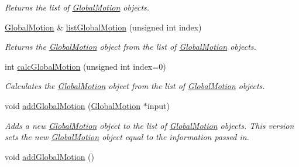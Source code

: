 \begin{DoxyCompactItemize}
\begin{DoxyCompactList}\small\item\em Returns the list of \hyperlink{classosea_1_1ofreq_1_1_global_motion}{Global\-Motion} objects. \end{DoxyCompactList}\item 
\hyperlink{classosea_1_1ofreq_1_1_global_motion}{Global\-Motion} \& \hyperlink{classosea_1_1ofreq_1_1_outputs_body_a663088b51a3645982f5cc2111a72563a}{list\-Global\-Motion} (unsigned int index)
\begin{DoxyCompactList}\small\item\em Returns the \hyperlink{classosea_1_1ofreq_1_1_global_motion}{Global\-Motion} object from the list of \hyperlink{classosea_1_1ofreq_1_1_global_motion}{Global\-Motion} objects. \end{DoxyCompactList}\item 
int \hyperlink{classosea_1_1ofreq_1_1_outputs_body_a4d34ba129bf256740731225b11c579bf}{calc\-Global\-Motion} (unsigned int index=0)
\begin{DoxyCompactList}\small\item\em Calculates the \hyperlink{classosea_1_1ofreq_1_1_global_motion}{Global\-Motion} object from the list of \hyperlink{classosea_1_1ofreq_1_1_global_motion}{Global\-Motion} objects. \end{DoxyCompactList}\item 
void \hyperlink{classosea_1_1ofreq_1_1_outputs_body_a015653c3344d036543668ffe7b4a41db}{add\-Global\-Motion} (\hyperlink{classosea_1_1ofreq_1_1_global_motion}{Global\-Motion} $\ast$input)
\begin{DoxyCompactList}\small\item\em Adds a new \hyperlink{classosea_1_1ofreq_1_1_global_motion}{Global\-Motion} object to the list of \hyperlink{classosea_1_1ofreq_1_1_global_motion}{Global\-Motion} objects. This version sets the new \hyperlink{classosea_1_1ofreq_1_1_global_motion}{Global\-Motion} object equal to the information passed in. \end{DoxyCompactList}\item 
\hypertarget{classosea_1_1ofreq_1_1_outputs_body_a889dcf6d9be6e910c110018e0a309eae}{void \hyperlink{classosea_1_1ofreq_1_1_outputs_body_a889dcf6d9be6e910c110018e0a309eae}{add\-Global\-Motion} ()}\label{classosea_1_1ofreq_1_1_outputs_body_a889dcf6d9be6e910c110018e0a309eae}


\end{DoxyCompactItemize}

